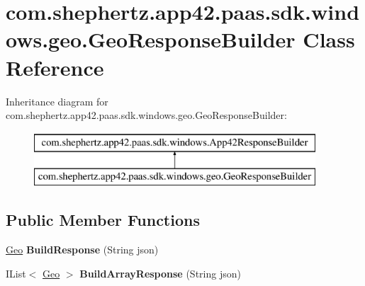 \hypertarget{classcom_1_1shephertz_1_1app42_1_1paas_1_1sdk_1_1windows_1_1geo_1_1_geo_response_builder}{\section{com.\+shephertz.\+app42.\+paas.\+sdk.\+windows.\+geo.\+Geo\+Response\+Builder Class Reference}
\label{classcom_1_1shephertz_1_1app42_1_1paas_1_1sdk_1_1windows_1_1geo_1_1_geo_response_builder}
}
Inheritance diagram for com.\+shephertz.\+app42.\+paas.\+sdk.\+windows.\+geo.\+Geo\+Response\+Builder\+:\begin{figure}[H]
\begin{center}
\leavevmode
\includegraphics[height=2.000000cm]{classcom_1_1shephertz_1_1app42_1_1paas_1_1sdk_1_1windows_1_1geo_1_1_geo_response_builder}
\end{center}
\end{figure}
\subsection*{Public Member Functions}
\begin{DoxyCompactItemize}
\item 
\hypertarget{classcom_1_1shephertz_1_1app42_1_1paas_1_1sdk_1_1windows_1_1geo_1_1_geo_response_builder_abf8527cdb5ea14b933a7b6ce1cd1eccf}{\hyperlink{classcom_1_1shephertz_1_1app42_1_1paas_1_1sdk_1_1windows_1_1geo_1_1_geo}{Geo} {\bfseries Build\+Response} (String json)}\label{classcom_1_1shephertz_1_1app42_1_1paas_1_1sdk_1_1windows_1_1geo_1_1_geo_response_builder_abf8527cdb5ea14b933a7b6ce1cd1eccf}

\item 
\hypertarget{classcom_1_1shephertz_1_1app42_1_1paas_1_1sdk_1_1windows_1_1geo_1_1_geo_response_builder_aaddc0d7f119cad9a1132d932d18a6e3d}{I\+List$<$ \hyperlink{classcom_1_1shephertz_1_1app42_1_1paas_1_1sdk_1_1windows_1_1geo_1_1_geo}{Geo} $>$ {\bfseries Build\+Array\+Response} (String json)}\label{classcom_1_1shephertz_1_1app42_1_1paas_1_1sdk_1_1windows_1_1geo_1_1_geo_response_builder_aaddc0d7f119cad9a1132d932d18a6e3d}

\end{DoxyCompactItemize}
